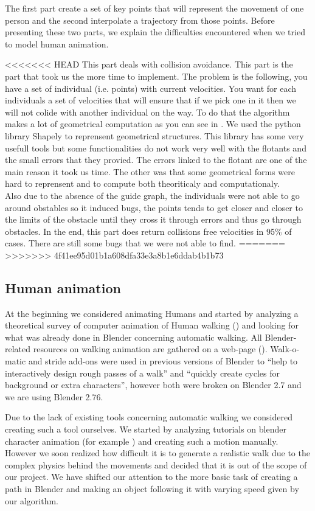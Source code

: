 The first part create a set of key points that will represent the
movement of one person and the second interpolate a trajectory from
those points. Before presenting these two parts, we explain the
difficulties encountered when we tried to model human animation.

<<<<<<< HEAD
This part deals with collision avoidance. This part is the part that took us the more time to implement. The problem is the following, you have a set of individual (i.e. points) with current velocities. You want for each individuals a set of velocities that will ensure that if we pick one in it then we will not colide with another individual on the way. To do that the algorithm makes a lot of geometrical computation as you can see in \cite{vandenBerg2011}. We used the python library Shapely to reprensent geometrical structures. This library has some very usefull tools but some functionalities do not work very well with the flotants and the small errors that they provied. The errors linked to the flotant are one of the main reason it took us time. The other was that some geometrical forms were hard to reprensent and to compute both theoriticaly and computationaly.\\
Also due to the absence of the guide graph, the individuals were not able to go around obstables so it induced bugs, the points tends to get closer and closer to the limits of the obstacle until they cross it through errors and thus go through obstacles.
In the end, this part does return collisions free velocities in 95\% of cases. There are still some bugs that we were not able to find.
=======
>>>>>>> 4f41ee95d01b1a608dfa33e3a8b1e6ddab4b1b73

\subsection{Human animation}

At the beginning we considered animating Humans and started by
analyzing a theoretical survey of computer animation of Human walking
(\cite{th_walking}) and looking for what was already done in Blender
concerning automatic walking. All Blender-related resources on walking
animation are gathered on a web-page
(\cite{blwikiwalking}). Walk-o-matic and stride add-ons were used in
previous versions of Blender to ``help to interactively design rough
passes of a walk'' and ``quickly create cycles for background or extra
characters'', however both were broken on Blender 2.7 and we are using
Blender 2.76.

Due to the lack of existing tools concerning automatic walking we
considered creating such a tool ourselves. We started by analyzing
tutorials on blender character animation (for example
\cite{tuto_walk}) and creating such a motion manually. However we soon
realized how difficult it is to generate a realistic walk due to the
complex physics behind the movements and decided that it is out of the
scope of our project. We have shifted our attention to the more basic
task of creating a path in Blender and making an object following it
with varying speed given by our algorithm.


